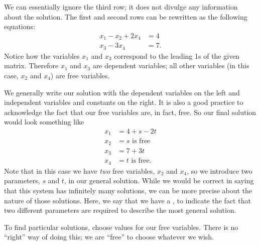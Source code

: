 {We can essentially ignore the third row; it does not divulge any information about the solution.
 The first and second rows can be rewritten as the following equations: 
\begin{align*} 
 x_1 - x_2 + 2x_4 &=4 \\
 x_3 - 3x_4 &= 7.
\end{align*} 
Notice how the variables $x_1$ and $x_3$ correspond to the leading 1s of the given matrix. Therefore $x_1$ and $x_3$ are dependent variables; all other variables (in this case, $x_2$ and $x_4$) are free variables.

We generally write our solution with the dependent variables on the left and independent variables and constants on the right. It is also a good practice to acknowledge the fact that our free variables are, in fact, free. So our final solution would look something like 
\begin{align*} 
 x_1 &= 4 + s - 2t \\ 
 x_2 &= s \text{ is free} \\
 x_3 &= 7+3t \\ 
 x_4 &= t \text{ is free}.
\end{align*}
Note that in this case we have \textit{two} free variables, $x_2$ and $x_4$, so we introduce two parameters, $s$ and $t$, in our general solution. While we would be correct in saying that this system has infinitely many solutions, we can be more precise about the nature of those solutions. Here, we say that we have a , to indicate the fact that two different parameters are required to describe the most general solution.


To find particular solutions, choose values for our free variables. There is no ``right'' way of doing this; we are ``free'' to choose whatever we wish. 

}

